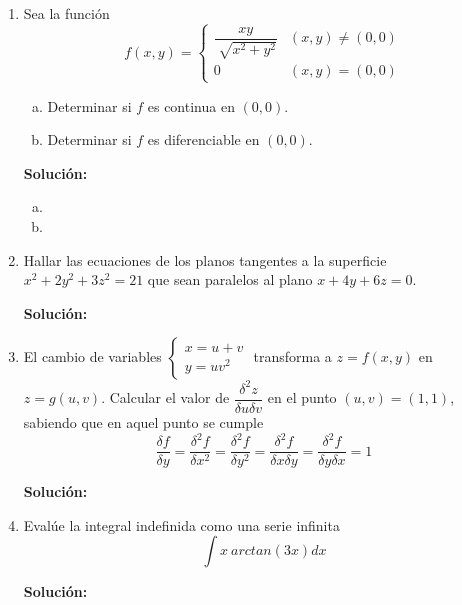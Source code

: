\documentclass[12pt]{article}
\newenvironment{solucion}
{\begin{mdframed}[backgroundcolor=black!10]
		{\bf Solución:}\\
	}
	{
	\end{mdframed}
}
\newenvironment{preguntas}
{\begin{enumerate}\itemsep12pt
	}
	{
	\end{enumerate}
}
\begin{document}
\begin{preguntas}
\item Sea la función
	$$f(x,y)=
	\begin{cases}
	\dfrac{xy}{\sqrt[]{x^2+y^2}} & (x,y) \neq (0,0)\\
	0 & (x,y)=(0,0)
	\end{cases}
	$$
\begin{enumerate}[a)]
\item Determinar si $f$ es continua en $(0,0)$.
\item Determinar si $f$ es diferenciable en $(0,0)$.
\end{enumerate}
\begin{solucion}

\begin{enumerate}[a)]
\item 
\item 
\end{enumerate}
\end{solucion}
\item Hallar las ecuaciones de los planos tangentes a la superficie $x^2 + 2y^2 + 3z^2 = 21$ que sean paralelos al plano $x + 4y + 6z = 0$.
\begin{solucion}

\end{solucion}
\item El cambio de variables 
	$\begin{cases}
	x=u+v\\
	y=uv^2
	\end{cases}$
	transforma a $z=f(x,y)$ en $z=g(u,v)$. Calcular el valor de $\dfrac{\delta^2z}{\delta u \delta v}$ en el punto $(u,v) = (1,1)$, sabiendo que en aquel punto se cumple$$\dfrac{\delta f}			{\delta y} = \dfrac{\delta^2 f}{\delta x^2}=\dfrac{\delta^2 f}{\delta y^2}=\dfrac{\delta^2 f}{\delta x \delta y}=\dfrac{\delta^2 f}{\delta y \delta x}=1$$
\begin{solucion}

\end{solucion}
\item Evalúe la integral indefinida como una serie infinita
	$$\int x\ arctan(3x)dx$$
\begin{solucion}

\end{solucion}
\end{preguntas}
\end{document}
